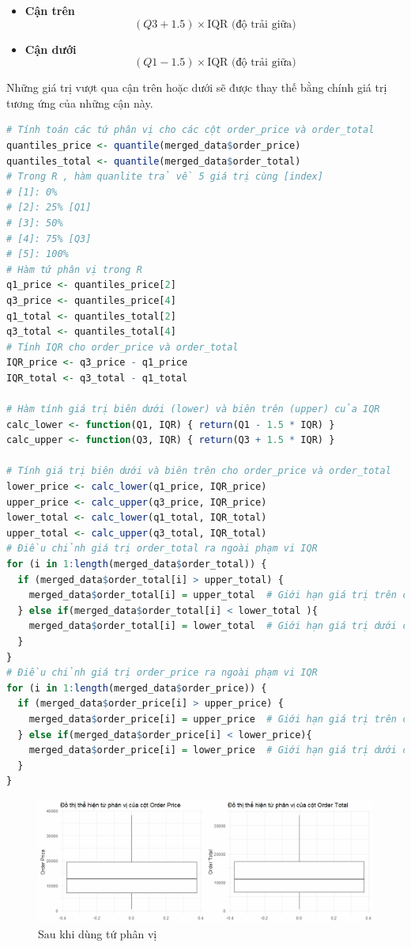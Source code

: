 \begin{itemize}
    \item \textbf{Cận trên} 
    $$( Q3 + 1.5) \times \text{IQR (độ trải giữa)}$$
    \item \textbf{Cận dưới} 
    $$( Q1 - 1.5) \times \text{IQR (độ trải giữa)}$$
\end{itemize}
Những giá trị vượt qua cận trên hoặc dưới sẽ được thay thế bằng chính giá trị tương ứng của những cận này.

\begin{lstlisting}[language=R, caption=Xử lý giá trị ngoại lai bằng phương pháp IQR]
# Tính toán các tứ phân vị cho các cột order_price và order_total
quantiles_price <- quantile(merged_data$order_price)
quantiles_total <- quantile(merged_data$order_total)
# Trong R , hàm quanlite trả về 5 giá trị cùng [index]
# [1]: 0%
# [2]: 25% [Q1]
# [3]: 50%
# [4]: 75% [Q3]
# [5]: 100%
# Hàm tứ phân vị trong R
q1_price <- quantiles_price[2]
q3_price <- quantiles_price[4]
q1_total <- quantiles_total[2]
q3_total <- quantiles_total[4]
# Tính IQR cho order_price và order_total
IQR_price <- q3_price - q1_price
IQR_total <- q3_total - q1_total

# Hàm tính giá trị biên dưới (lower) và biên trên (upper) của IQR
calc_lower <- function(Q1, IQR) { return(Q1 - 1.5 * IQR) }
calc_upper <- function(Q3, IQR) { return(Q3 + 1.5 * IQR) }

# Tính giá trị biên dưới và biên trên cho order_price và order_total
lower_price <- calc_lower(q1_price, IQR_price)
upper_price <- calc_upper(q3_price, IQR_price)
lower_total <- calc_lower(q1_total, IQR_total)
upper_total <- calc_upper(q3_total, IQR_total)
# Điều chỉnh giá trị order_total ra ngoài phạm vi IQR
for (i in 1:length(merged_data$order_total)) {
  if (merged_data$order_total[i] > upper_total) {
    merged_data$order_total[i] = upper_total  # Giới hạn giá trị trên của order_total
  } else if(merged_data$order_total[i] < lower_total ){
    merged_data$order_total[i] = lower_total  # Giới hạn giá trị dưới của order_total
  }
}
# Điều chỉnh giá trị order_price ra ngoài phạm vi IQR
for (i in 1:length(merged_data$order_price)) {
  if (merged_data$order_price[i] > upper_price) {
    merged_data$order_price[i] = upper_price  # Giới hạn giá trị trên của order_price
  } else if(merged_data$order_price[i] < lower_price){
    merged_data$order_price[i] = lower_price  # Giới hạn giá trị dưới của order_price
  }
}
\end{lstlisting}

\begin{figure}[!ht]
    \centering \includegraphics[width=15cm]{Images/img/4.2_remove_outlier/tu_phan_vi.jpg}
    \caption{Sau khi dùng tứ phân vị}
\end{figure}
